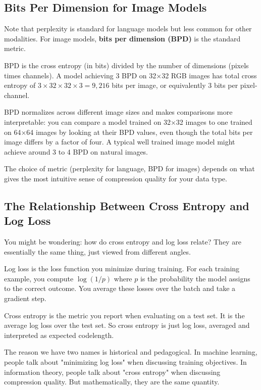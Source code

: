 \subsection{Bits Per Dimension for Image Models}

Note that perplexity is standard for language models but less common for other modalities. For image models, \textbf{bits per dimension (BPD)} is the standard metric. 

BPD is the cross entropy (in bits) divided by the number of dimensions (pixels times channels). A model achieving 3 BPD on 32×32 RGB images has total cross entropy of $3 \times 32 \times 32 \times 3 = 9{,}216$ bits per image, or equivalently 3 bits per pixel-channel. 

BPD normalizes across different image sizes and makes comparisons more interpretable: you can compare a model trained on 32×32 images to one trained on 64×64 images by looking at their BPD values, even though the total bits per image differs by a factor of four. A typical well trained image model might achieve around 3 to 4 BPD on natural images.

The choice of metric (perplexity for language, BPD for images) depends on what gives the most intuitive sense of compression quality for your data type.

\subsection{The Relationship Between Cross Entropy and Log Loss}

You might be wondering: how do cross entropy and log loss relate? They are essentially the same thing, just viewed from different angles.

Log loss is the loss function you minimize during training. For each training example, you compute $\log(1/p)$ where $p$ is the probability the model assigns to the correct outcome. You average these losses over the batch and take a gradient step.

Cross entropy is the metric you report when evaluating on a test set. It is the average log loss over the test set. So cross entropy is just log loss, averaged and interpreted as expected codelength.

The reason we have two names is historical and pedagogical. In machine learning, people talk about "minimizing log loss" when discussing training objectives. In information theory, people talk about "cross entropy" when discussing compression quality. But mathematically, they are the same quantity.

